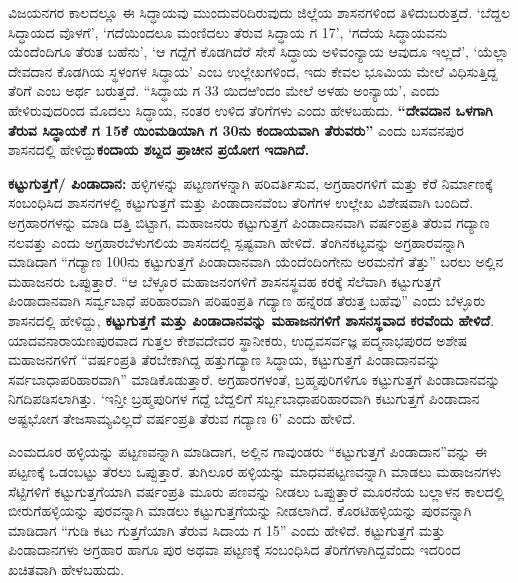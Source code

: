 ವಿಜಯನಗರ ಕಾಲದಲ್ಲೂ ಈ ಸಿದ್ಧಾಯವು ಮುಂದುವರಿದಿರುವುದು ಜಿಲ್ಲೆಯ ಶಾಸನಗಳಿಂದ ತಿಳಿದುಬರುತ್ತದೆ. ‘ಬೆದ್ದಲ ಸಿದ್ಧಾಯದ ವೊಳಗೆ’, ‘ಗದೆಯಿಂದಲೂ ಮಂಣಿದಲು ತೆರುವ ಸಿದ್ಧಾಯ ಗ 17’, ‘ಗದೆಯ ಸಿದ್ಧಾಯವನು ಯೆಂದೆಂದಿಗೂ ತೆರುತ ಬಹೆನು’, ‘ಆ ಗದ್ದೆಗೆ ಕೊಡಗಿದೆರೆ ಸೇಸೆ ಸಿದ್ಧಾಯ ಅಳಿವಂನ್ಯಾಯ ಆವುದೂ ಇಲ್ಲದೆ’, ‘ಯೆಲ್ಲಾ ದೇವದಾನ ಕೊಡಗಿಯ ಸ್ಥಳಂಗಳ ಸಿದ್ಧಾಯ’ ಎಂಬ ಉಲ್ಲೇಖಗಳಿಂದ, ಇದು ಕೇವಲ ಭೂಮಿಯ ಮೇಲೆ ವಿಧಿಸುತ್ತಿದ್ದ ತೆರಿಗೆ ಎಂಬ ಅರ್ಥ ಬರುತ್ತದೆ. “ಸಿದ್ಧಾಯ ಗ 33 ಯಿದಱಿಂದಂ ಮೇಲೆ ಅಳಹು ಅಂನ್ಯಾಯ’, ಎಂದು ಹೇಳಿರುವುದರಿಂದ ಮೊದಲು ಸಿದ್ಧಾಯ, ನಂತರ ಉಳಿದ ತೆರಿಗೆಗಳು ಎಂದು ಹೇಳಬಹುದು. \textbf{“ದೇವದಾನ ಒಳಗಾಗಿ ತೆರುವ ಸಿದ್ಧಾಯಕೆ ಗ 15ಕೆ ಯಿಂಮಡಿಯಾಗಿ ಗ 30ನು ಕಂದಾಯವಾಗಿ ತೆರುವರು”} ಎಂದು ಬಸವನಪುರ ಶಾಸನದಲ್ಲಿ ಹೇಳಿದ್ದು\textbf{ಕಂದಾಯ ಶಬ್ದದ ಪ್ರಾಚೀನ ಪ್ರಯೋಗ ಇದಾಗಿದೆ.}

\textbf{ಕಟ್ಟುಗುತ್ತಗೆ/ ಪಿಂಡಾದಾನ:} ಹಳ್ಳಿಗಳನ್ನು ಪಟ್ಟಣಗಳನ್ನಾಗಿ ಪರಿವರ್ತಿಸುವ, ಅಗ್ರಹಾರಗಳಿಗೆ ಮತ್ತು ಕೆರೆ ನಿರ್ಮಾಣಕ್ಕೆ ಸಂಬಂಧಿಸಿದ ಶಾಸನಗಳಲ್ಲಿ ಕಟ್ಟುಗುತ್ತಗೆ ಮತ್ತು ಪಿಂಡಾದಾನವೆಂಬ ತೆರಿಗೆಗಳ ಉಲ್ಲೇಖ ವಿಶೇಷವಾಗಿ ಬಂದಿದೆ. ಅಗ್ರಹಾರಗಳನ್ನು ಮಾಡಿ ದತ್ತಿ ಬಿಟ್ಟಾಗ, ಮಹಾಜನರು ಕಟ್ಟುಗುತ್ತಗೆ ಪಿಂಡಾದಾನವಾಗಿ ವರ್ಷಂಪ್ರತಿ ತೆರುವ ಗದ್ಯಾಣ ನಲವತ್ತು ಎಂದು ಅಗ್ರಹಾರಬೆಳುಗಲಿಯ ಶಾಸನದಲ್ಲಿ ಸ್ಪಷ್ಟವಾಗಿ ಹೇಳಿದೆ. ತೆಂಗಿನಕಟ್ಟವನ್ನು ಅಗ್ರಹಾರವನ್ನಾಗಿ ಮಾಡಿದಾಗ “ಗದ್ಯಾಣ 100ನು ಕಟ್ಟುಗುತ್ತಗೆ ಪಿಂಡಾದಾನವಾಗಿ ಯೆಂದೆಂದಿಂಗೇನು ಅರಮನೆಗೆ ತೆತ್ತು” ಬರಲು ಅಲ್ಲಿನ ಮಹಾಜನರು ಒಪ್ಪುತ್ತಾರೆ. “ಆ ಬೆಳ್ಳೂರ ಮಹಾಜನಂಗಳಿಗೆ ಶಾಸನಸ್ಥವಹ ಕರಕ್ಕೆ ಸೆಲೆವಾಗಿ ಕಟ್ಟುಗುತ್ತಗೆ ಪಿಂಡಾದಾನವಾಗಿ ಸರ್ವ್ವಬಾಧೆ ಪರಿಹಾರವಾಗಿ ಪರಿಷಂಪ್ರತಿ ಗದ್ಯಾಣ ಹನ್ನೆರಡ ತೆರುತ್ತ ಬಹೆವು” ಎಂದು ಬೆಳ್ಳೂರು ಶಾಸನದಲ್ಲಿ ಹೇಳಿದ್ದು, \textbf{ಕಟ್ಟುಗುತ್ತಗೆ ಮತ್ತು ಪಿಂಡಾದಾನವನ್ನು ಮಹಾಜನಗಳಿಗೆ ಶಾಸನಸ್ಥವಾದ ಕರವೆಂದು ಹೇಳಿದೆ}. ಯಾದವನಾರಾಯಣಪುರವಾದ ಗುತ್ತಲ ಕೇಶವದೇವರ ಸ್ಥಾನೀಕರು, ಉದ್ಭವಸರ್ವಜ್ಞ ಪದ್ಮನಾಭಪುರದ ಅಶೇಷ ಮಹಾಜನಗಳಿಗೆ “ವರ್ಷಂಪ್ರತಿ ತೆರಬೇಕಾಗಿದ್ದ ಹತ್ತುಗದ್ಯಾಣ ಸಿದ್ಧಾಯ, ಕಟ್ಟುಗುತ್ತಗೆ ಪಿಂಡಾದಾನವನ್ನು ಸರ್ವಬಾಧಾಪರಿಹಾರವಾಗಿ” ಮಾಡಿಕೊಡುತ್ತಾರೆ. ಅಗ್ರಹಾರಗಳಂತೆ, ಬ್ರಹ್ಮಪುರಿಗಳಿಗೂ ಕಟ್ಟುಗುತ್ತಗೆ ಪಿಂಡಾದಾನವನ್ನು ನಿಗದಿಪಡಿಸಲಾಗಿತ್ತು. ‘ಇನ್ತೀ ಬ್ರಹ್ಮಪುರಿಗಳ ಗದ್ದೆ ಬೆದ್ದಲಿಗೆ ಸರ್ಬ್ಬಬಾಧಾಪರಿಹಾರವಾಗಿ ಕಟುಗುತ್ತಗೆ ಪಿಂಡಾದಾನ ಅಷ್ಟಭೋಗ ತೇಜಸಾಮ್ಯವಿಲ್ಲದೆ ವರ್ಷಂಪ್ರತಿ ತೆರುವ ಗದ್ಯಾಣ 6’ ಎಂದು ಹೇಳಿದೆ.

ಎಂಮದೂರ ಹಳ್ಳಿಯನ್ನು ಪಟ್ಟಣವನ್ನಾಗಿ ಮಾಡಿದಾಗ, ಅಲ್ಲಿನ ಗಾವುಂಡರು “ಕಟ್ಟುಗುತ್ತಗೆ ಪಿಂಡಾದಾನ”ವನ್ನು ಈ ಪಟ್ಟಣಕ್ಕೆ ಒಡಂಬಟ್ಟು ತೆರಲು ಒಪ್ಪುತ್ತಾರೆ. ತುಗಿಲೂರ ಹಳ್ಳಿಯನ್ನು ಮಾಧವಪಟ್ಟಣವನ್ನಾಗಿ ಮಾಡಲು ಮಹಾಜನಗಳು ಸೆಟ್ಟಿಗಳಿಗೆ ಕಟ್ಟುಗುತ್ತಗೆಯಾಗಿ ವರ್ಷಂಪ್ರತಿ ಮೂರು ಪಣವನ್ನು ನೀಡಲು ಒಪ್ಪುತ್ತಾರೆ ಮೂರನೆಯ ಬಲ್ಲಾಳನ ಕಾಲದಲ್ಲಿ ಬೀರುಗೆಹಳ್ಳಿಯನ್ನು ಪುರವನ್ನಾಗಿ ಮಾಡಲು ಕಟ್ಟುಗುತ್ತಗೆಯನ್ನು ನೀಡಲಾಗಿದೆ. ಕೊರಟಿಹಳ್ಳಿಯನ್ನು ಪುರವನ್ನಾಗಿ ಮಾಡಿದಾಗ “ಗುಡಿ ಕಟು ಗುತ್ತಗೆಯಾಗಿ ತೆರುವ ಸಿದಾಯ ಗ 15” ಎಂದು ಹೇಳಿದೆ. ಕಟ್ಟುಗುತ್ತಗೆ ಮತ್ತು ಪಿಂಡಾದಾನಗಳು ಅಗ್ರಹಾರ ಹಾಗೂ ಪುರ ಅಥವಾ ಪಟ್ಟಣಕ್ಕೆ ಸಂಬಂಧಿಸಿದ ತೆರಿಗೆಗಳಾಗಿದ್ದವೆಂದು ಇದರಿಂದ ಖಚಿತವಾಗಿ ಹೇಳಬಹುದು.

